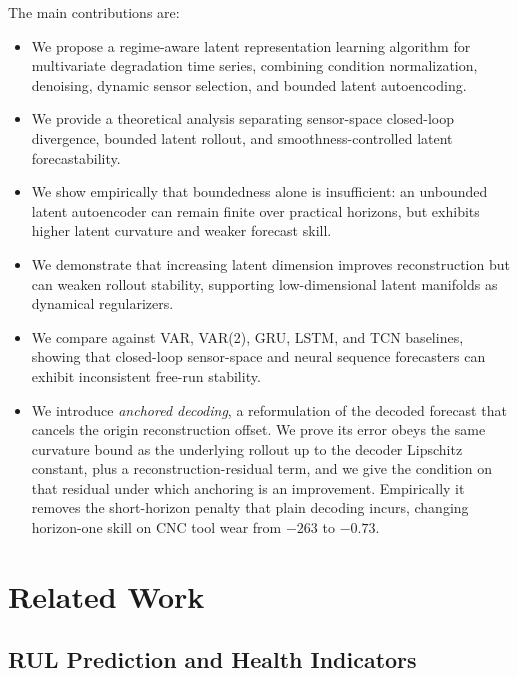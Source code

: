 \documentclass[a4paper,fleqn]{cas-sc}
\begin{document}
The main contributions are:
\begin{itemize}
    \item We propose a regime-aware latent representation learning algorithm for
    multivariate degradation time series, combining condition normalization,
    denoising, dynamic sensor selection, and bounded latent autoencoding.

    \item We provide a theoretical analysis separating sensor-space
    closed-loop divergence, bounded latent rollout, and smoothness-controlled
    latent forecastability.

    \item We show empirically that boundedness alone is insufficient: an
    unbounded latent autoencoder can remain finite over practical horizons,
    but exhibits higher latent curvature and weaker forecast skill.

    \item We demonstrate that increasing latent dimension improves
    reconstruction but can weaken rollout stability, supporting
    low-dimensional latent manifolds as dynamical regularizers.

    \item We compare against VAR, VAR(2), GRU, LSTM, and TCN baselines, showing
    that closed-loop sensor-space and neural sequence forecasters can exhibit
    inconsistent free-run stability.

    \item We introduce \emph{anchored decoding}, a reformulation of the decoded
    forecast that cancels the origin reconstruction offset. We prove its error
    obeys the same curvature bound as the underlying rollout up to the decoder
    Lipschitz constant, plus a reconstruction-residual term, and we give the
    condition on that residual under which anchoring is an improvement.
    Empirically it removes the short-horizon penalty that plain decoding incurs,
    changing horizon-one skill on CNC tool wear from $-263$ to $-0.73$.
\end{itemize}

\section{Related Work}
\label{sec:related}

\subsection{RUL Prediction and Health Indicators}
\end{document}
